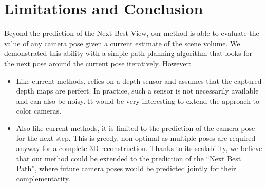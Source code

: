 \section{Limitations and Conclusion}

Beyond the prediction of the Next Best View, our method \method is able to evaluate the value of any camera pose given a current estimate of the scene volume. We demonstrated this ability with a simple path planning algorithm that looks for the next pose around the current pose iteratively. However:
\begin{itemize}[leftmargin=5mm]
    \item Like current methods, \method relies on a depth sensor and assumes that the captured depth maps are perfect. In practice, such a sensor is not necessarily available and can also be noisy. It would be very interesting to extend the approach to color cameras.
    \item Also like current methods, it is limited to the prediction of the camera pose for the next step. This is greedy, non-optimal as multiple poses are required anyway for a complete 3D reconstruction. Thanks to its scalability, we believe that our method could be extended to the prediction of the ``Next Best Path'', where future camera poses would be predicted jointly for their complementarity.
\end{itemize}